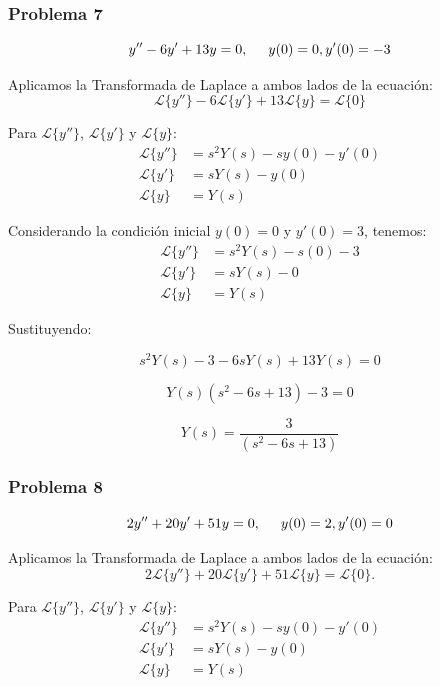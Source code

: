 \documentclass{article}
\begin{document}
\newpage


\subsubsection{Problema 7}

\[y'' - 6y' + 13y = 0, \hspace{.5cm} y(0) = 0, y'(0) = -3\]

Aplicamos la Transformada de Laplace a ambos lados de la ecuación:
\[
    \mathcal{L}\{y''\} - 6\mathcal{L}\{y'\} + 13\mathcal{L}\{y\} = \mathcal{L}\{0\}
\]

Para \(\mathcal{L}\{y''\}\), \(\mathcal{L}\{y'\}\) y \(\mathcal{L}\{y\}\):
\begin{align*}
    \mathcal{L}\{y''\} & = s^2Y(s) - sy(0) - y'(0) \\
    \mathcal{L}\{y'\}  & = sY(s) - y(0)            \\
    \mathcal{L}\{y\}   & = Y(s)
\end{align*}

Considerando la condición inicial $y(0) = 0$ y $y'(0) = 3$, tenemos:
\begin{align*}
    \mathcal{L}\{y''\} & = s^2Y(s) - s(0) - 3 \\
    \mathcal{L}\{y'\}  & = sY(s) - 0          \\
    \mathcal{L}\{y\}   & = Y(s)
\end{align*}

Sustituyendo:

\[
    s^2Y(s) - 3 - 6sY(s) + 13Y(s) = 0
\]

\[
    Y(s)(s^2 - 6s + 13) - 3 = 0
\]

\[
    Y(s) = \frac{3}{(s^2 - 6s + 13)}
\]

\newpage

\subsubsection{Problema 8}
\[2y'' + 20y' + 51y = 0, \hspace{.5cm} y(0) = 2, y'(0) = 0\]

Aplicamos la Transformada de Laplace a ambos lados de la ecuación:
\[
    2\mathcal{L}\{y''\} + 20\mathcal{L}\{y'\} + 51\mathcal{L}\{y\} = \mathcal{L}\{0\}.
\]

Para \(\mathcal{L}\{y''\}\), \(\mathcal{L}\{y'\}\) y \(\mathcal{L}\{y\}\):
\begin{align*}
    \mathcal{L}\{y''\} & = s^2Y(s) - sy(0) - y'(0) \\
    \mathcal{L}\{y'\}  & = sY(s) - y(0)            \\
    \mathcal{L}\{y\}   & = Y(s)
\end{align*}
\end{document}
